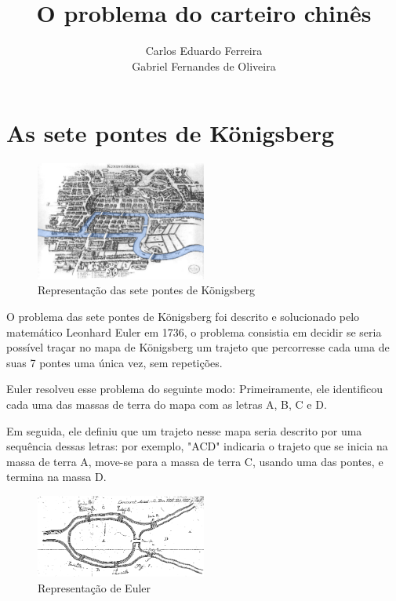 \documentclass[12pt, a4paper]{article}
\title{O problema do carteiro chinês}
\author{Carlos Eduardo Ferreira\\Gabriel Fernandes de Oliveira}
\date{}
\begin{document}
\maketitle

\section{As sete pontes de Königsberg}

\begin{figure} 
    \centering
    \includegraphics[width=0.5\textwidth]{konigsberg.png}
    \caption{Representação das sete pontes de Königsberg}
\end{figure}

O problema das sete pontes de Königsberg foi descrito e solucionado pelo matemático Leonhard Euler em 1736, o problema consistia em decidir se seria possível traçar no mapa de Königsberg um trajeto que percorresse cada uma de suas 7 pontes uma única vez, sem repetições.

Euler resolveu esse problema do seguinte modo: 
Primeiramente, ele identificou cada uma das massas de terra do mapa com as letras A, B, C e D.

Em seguida, ele definiu que um trajeto nesse mapa seria descrito por uma sequência dessas letras: por exemplo, "ACD" indicaria o trajeto que se inicia na massa de terra A, move-se para a massa de terra C, usando uma das pontes, e termina na massa D.

\begin{figure} 
    \centering
    \includegraphics[width=0.5\textwidth]{konigsberg-euler.png}
    \caption{Representação de Euler}
	\label{konigsberg-euler}
\end{figure}
\end{document}

